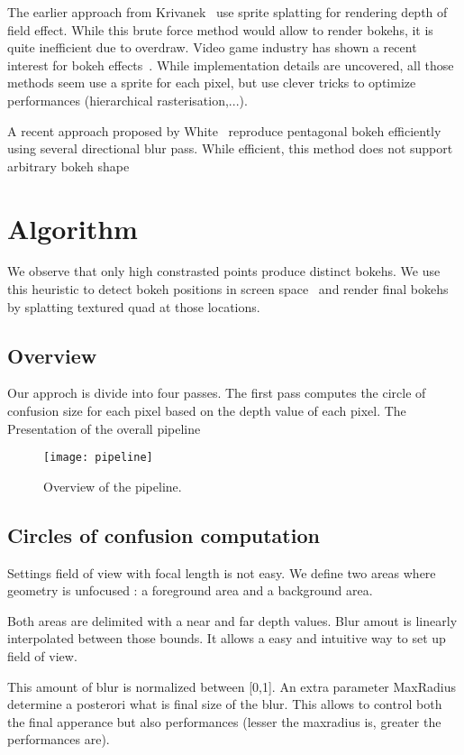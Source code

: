 The earlier approach from Krivanek~\cite{Krivanek03} use sprite splatting for rendering depth of field effect. While this brute force method would allow to render bokehs, it is quite inefficient due to overdraw. Video game industry has shown a recent interest for bokeh effects~\cite{Sousa11,Futurmark11,Mittring11}. While implementation details are uncovered, all those methods seem use a sprite for each pixel, but use clever tricks to optimize performances (hierarchical rasterisation,...). 

A recent approach proposed by White~\cite{White11} reproduce pentagonal bokeh efficiently using several directional blur pass. While efficient, this method does not support arbitrary bokeh shape

\section{Algorithm}
We observe that only high constrasted points produce distinct bokehs. We use this heuristic to detect bokeh positions in screen space~\cite{Pettineo11} and render final bokehs by splatting textured quad at those locations.

\subsection{Overview}
Our approch is divide into four passes. The first pass computes the circle of confusion size for each pixel based on the depth value of each pixel. The 
Presentation of the overall pipeline

	\begin{figure}[htb]\centering
	\texttt{[image: pipeline]}
	\caption{Overview of the pipeline.}
	\label{YourName:fig1}
	\end{figure}

\subsection{Circles of confusion computation}
Settings field of view with focal length is not easy.
We define two areas where geometry is unfocused : a foreground area and a background area.

Both areas are delimited with a near and far depth values. Blur amout is linearly interpolated between those bounds. It allows a easy and intuitive way to set up field of view.

This amount of blur is normalized between [0,1]. An extra parameter MaxRadius determine a posterori what is final size of the blur.
This allows to control both the final apperance but also performances (lesser the maxradius is, greater the performances are).


